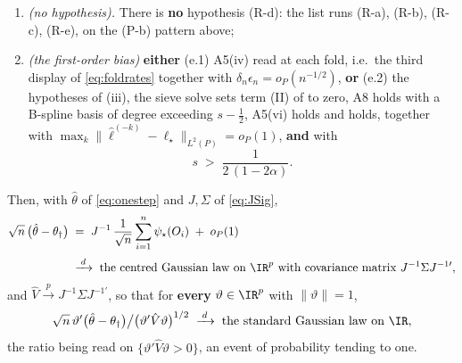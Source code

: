\begin{theorem}
\begin{enumerate}
\item[(R-d)] \emph{(no hypothesis).} There is \textbf{no} hypothesis (R-d): the list runs (R-a), (R-b),
(R-c), (R-e), on the \textup{(P-b)} pattern above;
\item[(R-e)] \emph{(the first-order bias)} \textbf{either} \textup{(e.1)} A5(iv) read at each fold, i.e.\ the
third display of \eqref{eq:foldrates} together with $\delta_n\epsilon_n=o_P(n^{-1/2})$, \textbf{or}
\textup{(e.2)} the hypotheses of \textup{(iii)}, the sieve solve sets term
\textup{(II)} of  to zero, A8 holds with a B-spline basis of degree exceeding
$s-\tfrac12$, A5(vi) holds and  holds, together with
$\max_k\|\hat\ell^{(-k)}-\ell_\star\|_{L^{2}(P)}=o_P(1)$, \textbf{and} with
\begin{equation}\label{eq:re2window}
s\;>\;\frac{1}{2\,(1-2\alpha)} .
\end{equation}
\end{enumerate}
Then, with $\hat\theta$ of \eqref{eq:onestep} and $J,\Sigma$ of \eqref{eq:JSig},
\begin{equation}\label{eq:rootn}
\begin{split}
\sqrt n\,\big(\hat\theta-\theta_\dagger\big)
&\;=\;J^{-1}\,\frac1{\sqrt n}\sum_{i=1}^{n}\psi_\star(O_i)\;+\;o_P(1)\\[2pt]
&\;\xrightarrow{\;d\;}\;\text{the centred Gaussian law on }\IR^{p}\text{ with covariance matrix }
J^{-1}\Sigma J^{-1\prime} ,
\end{split}
\end{equation}
and $\hat V\xrightarrow{p}J^{-1}\Sigma J^{-1\prime}$, so that for \textbf{every} $\vartheta\in\IR^{p}$ with
$\|\vartheta\|=1$,
\[
\sqrt n\,\vartheta'\big(\hat\theta-\theta_\dagger\big)\big/\big(\vartheta'\hat V\vartheta\big)^{1/2}
\;\xrightarrow{\;d\;}\;\text{the standard Gaussian law on }\IR ,
\]
the ratio being read on $\{\vartheta'\hat V\vartheta>0\}$, an event of probability tending to one.

\end{theorem}
